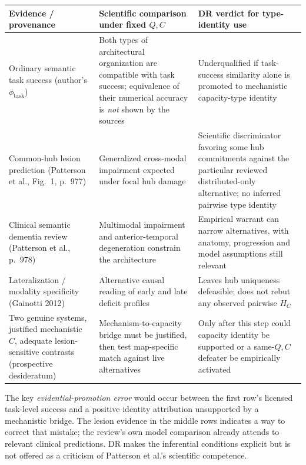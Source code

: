 \documentclass[11pt]{article}
\begin{document}
\begin{center}
\small
\begin{tabularx}{\textwidth}{>{\raggedright\arraybackslash}p{} X X}
\toprule
Evidence / provenance & Scientific comparison under fixed \(Q,C\) & DR verdict for type-identity use\\
\midrule
Ordinary semantic task success (author's \(\phi_{\mathrm{task}}\)) & Both types of architectural organization are compatible with task success; equivalence of their numerical accuracy is \emph{not} shown by the sources & Underqualified if task-success similarity alone is promoted to mechanistic capacity-type identity\\
Common-hub lesion prediction (Patterson et al., Fig.~1, p.~977) & Generalized cross-modal impairment expected under focal hub damage & Scientific discriminator favoring some hub commitments against the particular reviewed distributed-only alternative; no inferred pairwise type identity\\
Clinical semantic dementia review (Patterson et al., p.~978) & Multimodal impairment and anterior-temporal degeneration constrain the architecture & Empirical warrant can narrow alternatives, with anatomy, progression and model assumptions still relevant\\
Lateralization / modality specificity (Gainotti 2012) & Alternative causal reading of early and late deficit profiles & Leaves hub uniqueness defeasible; does not rebut any observed pairwise \(H_C\)\\
Two genuine systems, justified mechanistic \(C\), adequate lesion-sensitive contrasts (prospective desideratum) & Mechanism-to-capacity bridge must be justified, then test map-specific match against live alternatives & Only after this step could capacity identity be supported or a same-\(Q,C\) defeater be empirically activated\\
\bottomrule
\end{tabularx}
\end{center}

The key \emph{evidential-promotion error} would occur between the first row's licensed task-level success and a positive identity attribution unsupported by a mechanistic bridge. The lesion evidence in the middle rows indicates a way to correct that mistake; the review's own model comparison already attends to relevant clinical predictions. DR makes the inferential conditions explicit but is not offered as a criticism of Patterson et al.'s scientific competence.
\end{document}
